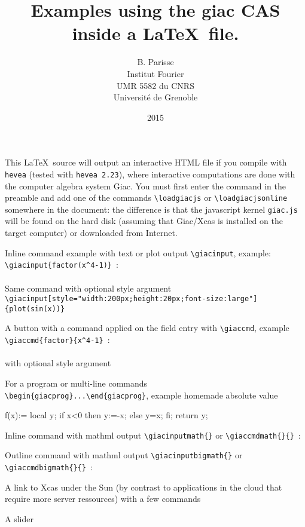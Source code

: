 \documentclass[a4paper,11pt]{article}
\title {Examples using the giac CAS inside a \LaTeX\ file.}
\author{B. Parisse\\Institut Fourier\\UMR 5582 du CNRS
\\Université de Grenoble}
\date{2015}
\begin{document}
\maketitle

This \LaTeX\ source will output an interactive HTML file if you compile
with {\tt hevea} (tested with \verb|hevea 2.23|), where interactive
computations are done with the computer algebra system Giac.
You must first enter the command \verb|| in the
preamble and add one of the commands \verb|\loadgiacjs| or \verb|\loadgiacjsonline|
somewhere in the document: the difference is that the javascript
kernel \verb|giac.js|
will be found on the hard disk (assuming that Giac/Xcas is
installed on the target computer) or downloaded from Internet.
\loadgiacjs

Inline command example with text or plot output \verb|\giacinput|, 
example: \verb|\giacinput{factor(x^4-1)}|~:\\
\\
Same command with optional style argument\\
\verb|\giacinput[style="width:200px;height:20px;font-size:large"]{plot(sin(x))}|\\

A button with a command applied on the field entry with
\verb|\giaccmd|, example \verb|\giaccmd{factor}{x^4-1}|~:\\
\\
with optional style argument

For a program or multi-line commands\\
\verb|\begin{giacprog}...\end{giacprog}|, example homemade absolute value\\
\begin{giacprog}
f(x):={
  local y;
  if x<0 then y:=-x; else y=x; fi;
  return y;
}
\end{giacprog}

Inline command with mathml output
\verb|\giacinputmath{}| or \verb|\giaccmdmath{}{}|~:

Outline command with mathml output
\verb|\giacinputbigmath{}| or \verb|\giaccmdbigmath{}{}|~:

A link to Xcas under the Sun (by contrast to applications in the
cloud that require more server ressources) with a few commands

A slider
\end{document}
